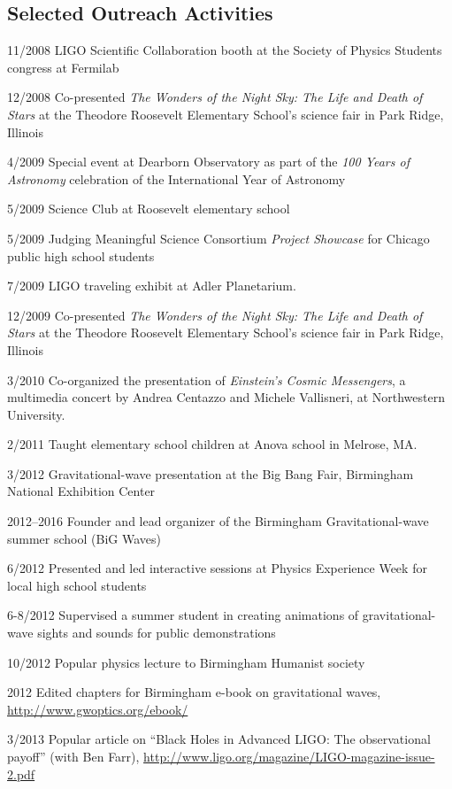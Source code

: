 \documentclass[margin,line]{res}
\begin{document}
\begin{resume}


\section{\sc Selected Outreach Activities}
11/2008 	LIGO Scientific Collaboration booth at the Society of Physics Students congress at Fermilab

12/2008 	Co-presented {\it The Wonders of the Night Sky: The Life and Death of Stars} at the Theodore Roosevelt Elementary School's science fair in Park Ridge, Illinois

4/2009 	Special event at Dearborn Observatory as part of the {\it 100 Years of Astronomy} celebration of the International Year of Astronomy

5/2009	Science Club at Roosevelt elementary school

5/2009	Judging Meaningful Science Consortium {\it Project Showcase} for Chicago public high school students

7/2009 	 LIGO traveling exhibit at Adler Planetarium. 

12/2009 	Co-presented {\it The Wonders of the Night Sky: The Life and Death of Stars} at the Theodore Roosevelt Elementary School's science fair in Park Ridge, Illinois

3/2010  	Co-organized the presentation of {\it Einstein's Cosmic Messengers}, a multimedia concert by Andrea Centazzo and Michele Vallisneri, at Northwestern University.

2/2011	Taught elementary school children at Anova school in Melrose, MA.

3/2012	Gravitational-wave presentation at the Big Bang Fair, Birmingham National Exhibition Center

2012--2016	Founder and lead organizer of the Birmingham Gravitational-wave summer school (BiG Waves)

6/2012	Presented and led interactive sessions at Physics Experience Week for local high school students

6-8/2012	Supervised a summer student in creating animations of gravitational-wave sights and sounds for public demonstrations

10/2012	Popular physics lecture to Birmingham Humanist society

2012		Edited chapters for Birmingham e-book on gravitational waves, \url{http://www.gwoptics.org/ebook/}
	  
3/2013	Popular article on ``Black Holes in Advanced LIGO: The observational payoff'' (with Ben Farr), \url{http://www.ligo.org/magazine/LIGO-magazine-issue-2.pdf}


\end{resume}
\end{document}
